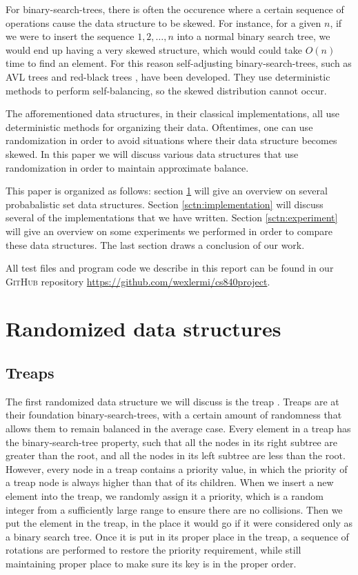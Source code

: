 \documentclass[oribibl]{llncs}
\begin{document}
For binary-search-trees, there is often the occurence where a certain sequence of operations cause the data structure to be skewed. For instance, for a given $n$, if we were to insert the sequence $1, 2, \dots, n$ into a normal binary search tree, we would end up having a very skewed structure, which would could take $O(n)$ time to find an element. For this reason self-adjusting binary-search-trees, such as AVL trees \cite{avl_tree} and red-black trees \cite{red_black_trees}, have been developed. They use deterministic methods to perform self-balancing, so the skewed distribution cannot occur.

The afforementioned data structures, in their classical implementations, all use deterministic methods for organizing their data.  Oftentimes, one can use randomization in order to avoid situations where their data structure becomes skewed. In this paper we will discuss various data structures that use randomization in order to maintain approximate balance.

This paper is organized as follows: section \ref{sctn:randomized_data_structures} will give an overview on several probabalistic set data structures. Section \ref{sctn:implementation} will discuss several of the implementations that we have written. Section \ref{sctn:experiment} will give an overview on some experiments we performed in order to compare these data structures. The last section draws a conclusion of our work.

All test files and program code we describe in this report can be found in our \textsc{GitHub} repository \url{https://github.com/wexlermi/cs840project}.


\section{Randomized data structures}
\label{sctn:randomized_data_structures}

\subsection{Treaps}
The first randomized data structure we will discuss is the treap \cite{Aragon1989}. Treaps are at their foundation binary-search-trees, with a certain amount of randomness that allows them to remain balanced in the average case. Every element in a treap has the binary-search-tree property, such that all the nodes in its right subtree are greater than the root, and all the nodes in its left subtree are less than the root. However, every node in a treap contains a priority value, in which the priority of a treap node is always higher than that of its children. When we insert a new element into the treap, we randomly assign it a priority, which is a random integer from a sufficiently large range to ensure there are no collisions. Then we put the element in the treap, in the place it would go if it were considered only as a binary search tree. Once it is put in its proper place in the treap, a sequence of rotations are performed to restore the priority requirement, while still maintaining proper place to make sure its key is in the proper order.
\end{document}

